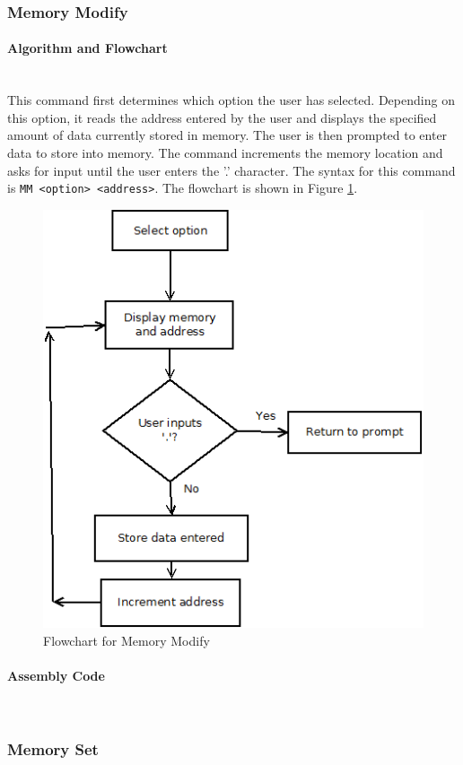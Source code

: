 \documentclass[12pt]{article}
\begin{document}
			\subsubsection{Memory Modify}
			
			\paragraph{Algorithm and Flowchart}~\\
			This command first determines which option the user has selected. Depending on this option, it reads the address entered by the user and displays the specified amount of data currently stored in memory. The user is then prompted to enter data to store into memory. The command increments the memory location and asks for input until the user enters the '.' character. The syntax for this command is \texttt{MM <option> <address>}. The flowchart is shown in Figure \ref{fig:MM}.
			
\begin{figure}[H]
\centering
\includegraphics[width=0.7\linewidth]{MM}
\caption{Flowchart for Memory Modify}
\label{fig:MM}
\end{figure}
			\paragraph{Assembly Code}~\\
			
			\subsubsection{Memory Set}
\end{document}
